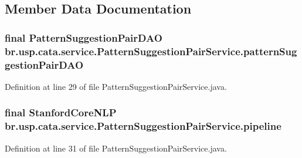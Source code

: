 \subsection{Member Data Documentation}
\hypertarget{classbr_1_1usp_1_1cata_1_1service_1_1_pattern_suggestion_pair_service_a5969c6f6b0cc6832dc8397d969da7692}{
\subsubsection[{pattern\+Suggestion\+Pair\+D\+A\+O}]{\setlength{\rightskip}{0pt plus 5cm}final {\bf Pattern\+Suggestion\+Pair\+D\+A\+O} br.\+usp.\+cata.\+service.\+Pattern\+Suggestion\+Pair\+Service.\+pattern\+Suggestion\+Pair\+D\+A\+O\hspace{0.3cm}{\ttfamily [private]}}}\label{classbr_1_1usp_1_1cata_1_1service_1_1_pattern_suggestion_pair_service_a5969c6f6b0cc6832dc8397d969da7692}


Definition at line 29 of file Pattern\+Suggestion\+Pair\+Service.\+java.

\hypertarget{classbr_1_1usp_1_1cata_1_1service_1_1_pattern_suggestion_pair_service_a5d225bf896d42045182abf2ea7224568}{
\subsubsection[{pipeline}]{\setlength{\rightskip}{0pt plus 5cm}final Stanford\+Core\+N\+L\+P br.\+usp.\+cata.\+service.\+Pattern\+Suggestion\+Pair\+Service.\+pipeline\hspace{0.3cm}{\ttfamily [private]}}}\label{classbr_1_1usp_1_1cata_1_1service_1_1_pattern_suggestion_pair_service_a5d225bf896d42045182abf2ea7224568}


Definition at line 31 of file Pattern\+Suggestion\+Pair\+Service.\+java.

